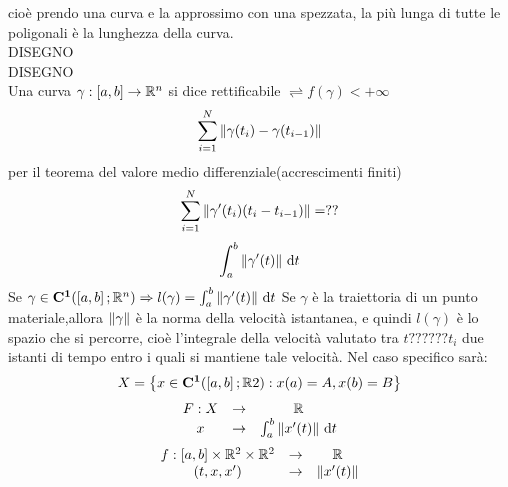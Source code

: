 cioè prendo una curva e la approssimo con una spezzata, la più lunga di tutte le poligonali è la lunghezza della curva.\\
DISEGNO\\
DISEGNO\\
Una curva $\gamma:\left[a,b\right]\to\mathbb{R}^n$ si dice rettificabile $\rightleftharpoons f(\gamma)<+\infty$
\observation
$$\sum\limits_{i=1}^{N}\left\|\gamma(t_i)-\gamma(t_{i-1})\right\| $$
per il teorema del valore medio differenziale(accrescimenti finiti)
$$\sum\limits_{i=1}^{N}\left\| \gamma'(t_i)(t_i-t_{i-1})\right\| =??$$
$$\int_{a}^{b}\left\| \gamma'(t)\right\| \,\mathrm{d}{t}$$
\proposition
Se $\gamma\in \mathbf{C^{1}}(\left[a,b\right];\mathbb{R}^n)\Rightarrow l(\gamma)=\int_a^b\left\|\gamma'(t)\right\|\,\mathrm{d}{t}$
\observation
Se $\gamma$ è la traiettoria di un punto materiale,allora $\left\|\gamma\right\|$ è la norma della velocità istantanea, e quindi $l(\gamma)$ è lo spazio che si percorre, cioè l'integrale della velocità valutato tra $t??????t_i$ due istanti di tempo entro i quali si mantiene tale velocità.
\observation
Nel caso specifico sarà:
$$ X=\left\{ x\in \mathbf{C^{1}}(\left[a,b\right];\mathbb{R}2): x(a)=A, x(b)=B \right\} $$
$$\begin{array}{ccc} 
F: X & \to & \mathbb{R} \\
x & \to & \int_{a}^b \left\|x'(t)\right\|\,\mathrm{d}{t}
\end{array}$$
$$\begin{array}{ccc} 
f: \left[a,b\right]\times\mathbb{R}^2\times\mathbb{R}^2 & \to & \mathbb{R} \\
(t,x, x') & \to &  \left\|x'(t)\right\|
\end{array}$$

